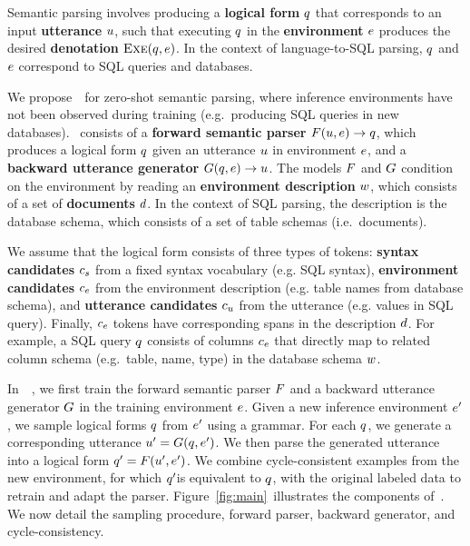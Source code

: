 \documentclass[11pt,a4paper]{article}
\begin{document}
\section{\papertitle}
\label{sec:method}
 
Semantic parsing involves producing a \textbf{logical form} ${q}$ that corresponds to an input \textbf{utterance} ${u}$, such that executing ${q}$ in the \textbf{environment} ${e}$ produces the desired \textbf{denotation} ${\textsf{\textsc{Exe}}({q}, {e})}$.
In the context of language-to-SQL parsing, ${q}$ and ${e}$ correspond to SQL queries and databases.

We propose~\modelnameshort~for zero-shot semantic parsing, where inference environments have not been observed during training (e.g.~producing SQL queries in new databases).
\modelnameshort~consists of a \textbf{forward semantic parser} ${F}({u}, {e}) \rightarrow {q}$, which produces a logical form ${q}$ given an utterance ${u}$ in environment ${e}$, and a \textbf{backward utterance generator} ${G}({q}, {e}) \rightarrow {u}$.
The models ${F}$ and ${G}$ condition on the environment by reading an \textbf{environment description} ${w}$, which consists of a set of \textbf{documents} ${d}$.
In the context of SQL parsing, the description is the database schema, which consists of a set of table schemas (i.e.~documents).

We assume that the logical form consists of three types of tokens: \textbf{syntax candidates} ${c}_{s}$ from a fixed syntax vocabulary (e.g. SQL syntax), \textbf{environment candidates} ${c}_{e}$ from the environment description (e.g. table names from database schema), and \textbf{utterance candidates} ${c}_{u}$ from the utterance (e.g. values in SQL query).
Finally, ${c}_{e}$ tokens have corresponding spans in the description ${d}$.
For example, a SQL query ${q}$ consists of columns ${c}_{e}$ that directly map to related column schema (e.g.~table, name, type) in the database schema ${w}$.

In~\modelnameshort~, we first train the forward semantic parser ${F}$ and a backward utterance generator ${G}$ in the training environment ${e}$.
Given a new inference environment ${{e}^\prime}$, we sample logical forms ${q}$ from ${{e}^\prime}$ using a grammar.
For each ${q}$, we generate a corresponding utterance ${{u}^\prime} = {G}({q}, {{e}^\prime})$.
We then parse the generated utterance into a logical form ${{q}^\prime} = {F}({{u}^\prime}, {{e}^\prime})$.
We combine cycle-consistent examples from the new environment, for which ${{q}^\prime}$is equivalent to ${q}$, with the original labeled data to retrain and adapt the parser.
Figure~\ref{fig:main}~illustrates the components of~\modelnameshort.
We now detail the sampling procedure, forward parser, backward generator, and cycle-consistency.
\end{document}
